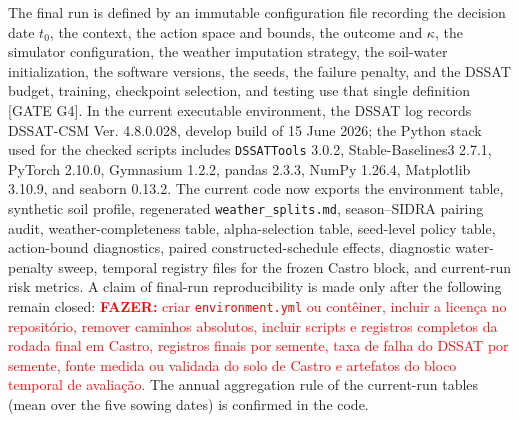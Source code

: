 \documentclass[times,final,authoryear]{elsarticle}
\begin{document}
The final run is defined by an immutable configuration file recording the decision date $t_0$, the context, the action space and bounds, the outcome and $\kappa$, the simulator configuration, the weather imputation strategy, the soil-water initialization, the software versions, the seeds, the failure penalty, and the DSSAT budget, training, checkpoint selection, and testing use that single definition [GATE G4]. In the current executable environment, the DSSAT log records DSSAT-CSM Ver. 4.8.0.028, develop build of 15 June 2026; the Python stack used for the checked scripts includes \texttt{DSSATTools} 3.0.2, Stable-Baselines3 2.7.1, PyTorch 2.10.0, Gymnasium 1.2.2, pandas 2.3.3, NumPy 1.26.4, Matplotlib 3.10.9, and seaborn 0.13.2. The current code now exports the environment table, synthetic soil profile, regenerated \texttt{weather\_splits.md}, season--SIDRA pairing audit, weather-completeness table, alpha-selection table, seed-level policy table, action-bound diagnostics, paired constructed-schedule effects, diagnostic water-penalty sweep, temporal registry files for the frozen Castro block, and current-run risk metrics. A claim of final-run reproducibility is made only after the following remain closed: \textcolor{red}{\textbf{FAZER:} criar \texttt{environment.yml} ou contêiner, incluir a licença no repositório, remover caminhos absolutos, incluir scripts e registros completos da rodada final em Castro, registros finais por semente, taxa de falha do DSSAT por semente, fonte medida ou validada do solo de Castro e artefatos do bloco temporal de avaliação.} The annual aggregation rule of the current-run tables (mean over the five sowing dates) is confirmed in the code.
\end{document}

